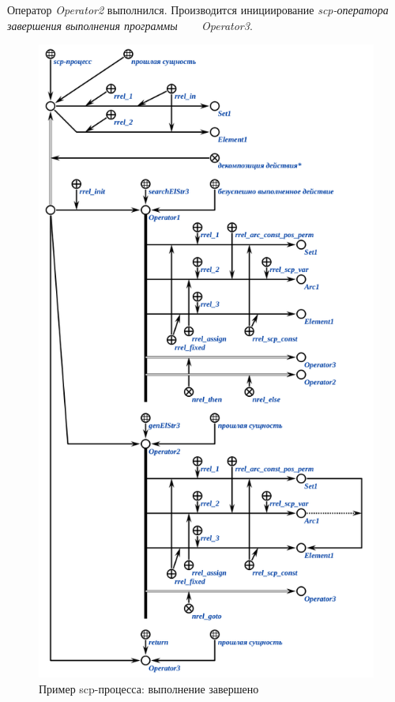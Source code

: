 Оператор \textit{Operator2} выполнился. Производится инициирование \textit{scp-оператора завершения выполнения программы} ~~~ \textit{Operator3}.

\begin{figure}[H]
	\centering
	\includegraphics[scale=0.8]{images/part3/chapter_situation_management/process_example4.png}
	\caption{Пример scp-процесса: выполнение завершено}
	\label{fig:process_example4}
\end{figure}

